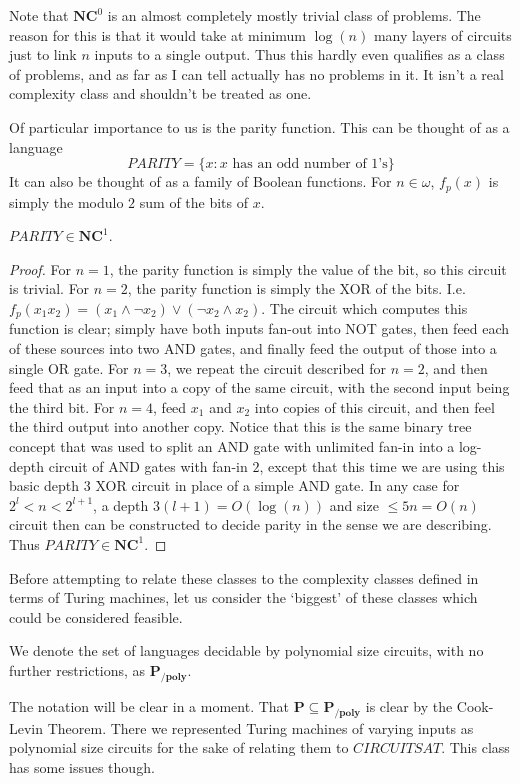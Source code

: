 Note that $\bm{NC}^0$ is an almost completely mostly trivial class of problems. The reason for this is that it would take at minimum $\log(n)$ many layers of circuits just to link $n$ inputs to a single output. Thus this hardly even qualifies as a class of problems, and as far as I can tell actually has no problems in it. It isn't a real complexity class and shouldn't be treated as one. \par 
Of particular importance to us is the parity function. This can be thought of as a language
\[ PARITY = \{x: x \textrm{ has an odd number of $1$'s}\} \]
It can also be thought of as a family of Boolean functions. For $n \in \omega$, $f_p(x)$ is simply the modulo $2$ sum of the bits of $x$. 
\begin{fact}
	$PARITY \in \bm{NC}^1$. 
\end{fact}
\begin{proof}
	For $n=1$, the parity function is simply the value of the bit, so this circuit is trivial. For $n=2$, the parity function is simply the XOR of the bits. I.e. $f_p(x_1x_2) = (x_1 \wedge \neg x_2) \vee (\neg x_2 \wedge x_2)$. The circuit which computes this function is clear; simply have both inputs fan-out into NOT gates, then feed each of these sources into two AND gates, and finally feed the output of those into a single OR gate. For $n=3$, we repeat the circuit described for $n=2$, and then feed that as an input into a copy of the same circuit, with the second input being the third bit. For $n=4$, feed $x_1$ and $x_2$ into copies of this circuit, and then feel the third output into another copy. Notice that this is the same binary tree concept that was used to split an AND gate with unlimited fan-in into a log-depth circuit of AND gates with fan-in $2$, except that this time we are using this basic depth $3$ XOR circuit in place of a simple AND gate. In any case for $2^l < n < 2^{l+1}$, a depth $3(l+1) = O(\log(n))$ and size $\leq 5n = O(n)$ circuit then can be constructed to decide parity in the sense we are describing. Thus $PARITY \in \bm{NC}^1$.
\end{proof}
Before attempting to relate these classes to the complexity classes defined in terms of Turing machines, let us consider the `biggest' of these classes which could be considered feasible.
\begin{definition}
	We denote the set of languages decidable by polynomial size circuits, with no further restrictions, as $\bm{P_{/poly}}$.
\end{definition}
The notation will be clear in a moment. That $\bm{P} \subseteq \bm{P_{/poly}}$ is clear by the Cook-Levin Theorem. There we represented Turing machines of varying inputs as polynomial size circuits for the sake of relating them to $CIRCUITSAT$. This class has some issues though. 
